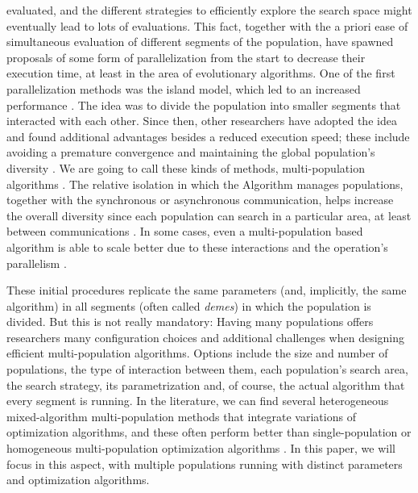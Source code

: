 \documentclass[runningheads]{llncs}
\begin{document}
evaluated, and the different strategies to efficiently explore the
search space might eventually lead to lots of evaluations.
This fact, together with the a priori ease of simultaneous evaluation
of different segments of the population, have spawned proposals of
some form of parallelization from the start
\cite{muhlenbein1988evolution} to decrease their execution time, at
least in the area of evolutionary algorithms. One of the first
parallelization methods was the island model, which led to an
increased performance
\cite{gorges1990explicit,grosso1985computer}. The idea was to divide
the population into smaller segments that interacted with each
other. Since then, other researchers have adopted the idea and found
additional advantages besides a reduced execution speed; these include
avoiding a premature convergence and maintaining the global
population's diversity \cite{li2015multi}. We are going to call these
kinds of methods, multi-population algorithms \cite{Ma2019}. The
relative isolation in which the Algorithm manages populations,
together with the synchronous or asynchronous communication, helps
increase the overall diversity since each population can search in a
particular area, at least between communications
\cite{li2016multi,wu2016differential}. In some cases, even a
multi-population based algorithm is able to scale better due to these
interactions and the operation's parallelism \cite{ALBA20027}.

These initial procedures replicate the same parameters (and,
implicitly, the same algorithm) in all
segments (often called {\em demes}) in which the population is
divided. But this is not really mandatory: Having many populations
offers researchers many configuration choices and additional
challenges when designing efficient multi-population algorithms.
Options include the size and number of populations, the type of
interaction between them, each population's search area, the search
strategy, its parametrization and, of course, the actual algorithm
that every segment is running. In the literature, we can find several
heterogeneous mixed-algorithm multi-population methods that integrate
variations of optimization algorithms, and these often perform better
than single-population or homogeneous multi-population optimization
algorithms \cite{wu2016differential,nseef2016adaptive}. In this paper,
we will focus in this aspect, with multiple populations running with
distinct parameters and optimization algorithms.
\end{document}
